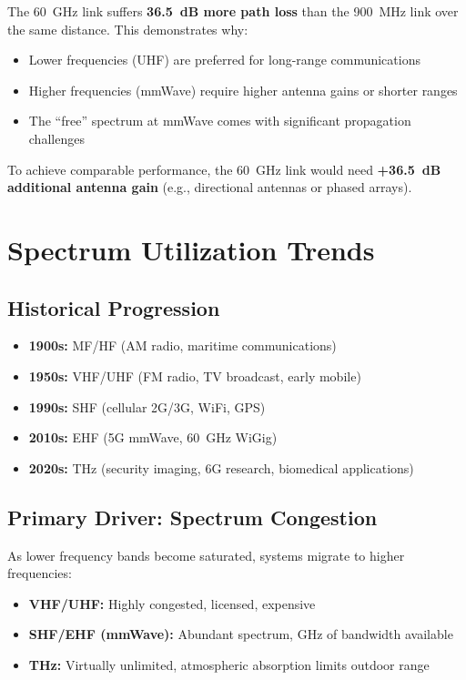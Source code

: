 The 60~GHz link suffers \textbf{36.5~dB more path loss} than the 900~MHz link over the same distance. This demonstrates why:
\begin{itemize}
\item Lower frequencies (UHF) are preferred for long-range communications
\item Higher frequencies (mmWave) require higher antenna gains or shorter ranges
\item The ``free'' spectrum at mmWave comes with significant propagation challenges
\end{itemize}

To achieve comparable performance, the 60~GHz link would need \textbf{+36.5~dB additional antenna gain} (e.g., directional antennas or phased arrays).

\section{Spectrum Utilization Trends}

\subsection{Historical Progression}

\begin{itemize}
\item \textbf{1900s:} MF/HF (AM radio, maritime communications)
\item \textbf{1950s:} VHF/UHF (FM radio, TV broadcast, early mobile)
\item \textbf{1990s:} SHF (cellular 2G/3G, WiFi, GPS)
\item \textbf{2010s:} EHF (5G mmWave, 60~GHz WiGig)
\item \textbf{2020s:} THz (security imaging, 6G research, biomedical applications)
\end{itemize}

\subsection{Primary Driver: Spectrum Congestion}

As lower frequency bands become saturated, systems migrate to higher frequencies:

\begin{itemize}
\item \textbf{VHF/UHF:} Highly congested, licensed, expensive
\item \textbf{SHF/EHF (mmWave):} Abundant spectrum, GHz of bandwidth available
\item \textbf{THz:} Virtually unlimited, atmospheric absorption limits outdoor range
\end{itemize}

